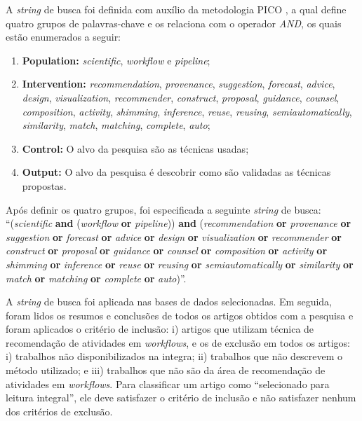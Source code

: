 A \emph{string} de busca foi definida com auxílio da metodologia PICO \cite{Huang2006}, a qual define quatro grupos de palavras-chave e os relaciona com o operador \emph{AND}, os quais estão enumerados a seguir:
\begin{enumerate}
\item \textbf{Population:} \emph{scientific}, \emph{workflow} e \emph{pipeline};
\item \textbf{Intervention:} \emph{recommendation}, \emph{provenance}, \emph{suggestion}, \emph{forecast}, \emph{advice}, \emph{design}, \emph{visualization}, \emph{recommender}, \emph{construct}, \emph{proposal}, \emph{guidance}, \emph{counsel}, \emph{composition}, \emph{activity}, \emph{shimming}, \emph{inference}, \emph{reuse}, \emph{reusing}, \emph{semiautomatically}, \emph{similarity}, \emph{match}, \emph{matching}, \emph{complete}, \emph{auto};
\item \textbf{Control:} O alvo da pesquisa são as técnicas usadas;
\item \textbf{Output:} O alvo da pesquisa é descobrir como são validadas as técnicas propostas.
\end{enumerate}

Após definir os quatro grupos, foi especificada a seguinte \emph{string} de busca:
``(\emph{scientific} \textbf{and} (\emph{workflow} \textbf{or} \emph{pipeline})) \textbf{and} (\emph{recommendation} \textbf{or} \emph{provenance} \textbf{or} \emph{suggestion} \textbf{or} \emph{forecast} \textbf{or} \emph{advice} \textbf{or} \emph{design} \textbf{or} \emph{visualization} \textbf{or} \emph{recommender} \textbf{or} \emph{construct} \textbf{or} \emph{proposal} \textbf{or} \emph{guidance} \textbf{or} \emph{counsel} \textbf{or} \emph{composition} \textbf{or} \emph{activity} \textbf{or} \emph{shimming} \textbf{or} \emph{inference} \textbf{or} \emph{reuse} \textbf{or} \emph{reusing} \textbf{or} \emph{semiautomatically} \textbf{or} \emph{similarity} \textbf{or} \emph{match} \textbf{or} \emph{matching} \textbf{or} \emph{complete} \textbf{or} \emph{auto})''.

A \emph{string} de busca foi aplicada nas bases de dados selecionadas. Em seguida, foram lidos os resumos e conclusões de todos os artigos obtidos com a pesquisa e foram aplicados o critério de inclusão: i) artigos que utilizam técnica de recomendação de atividades em \emph{workflows}, e os de exclusão em todos os artigos: i) trabalhos não disponibilizados na integra; ii) trabalhos que não descrevem o método utilizado; e iii) trabalhos que não são da área de recomendação de atividades em \emph{workflows}. Para classificar um artigo como ``selecionado para leitura integral'', ele deve satisfazer o critério de inclusão e não satisfazer nenhum dos critérios de exclusão.

